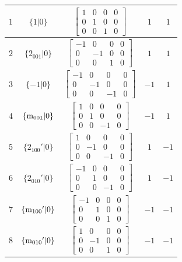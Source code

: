 \documentclass[fleqn,8pt]{jsarticle}
\begin{document}
\begin{longtable}{ccccc}
$ 1 $ & $ \{1|0\} $ & $ \begin{bmatrix} 1 & 0 & 0 & 0 \\ 0 & 1 & 0 & 0 \\ 0 & 0 & 1 & 0 \end{bmatrix} $ & $ 1 $ & $ 1 $ \\ \hline
$ 2 $ & $ \{2{}_{001}|0\} $ & $ \begin{bmatrix} -1 & 0 & 0 & 0 \\ 0 & -1 & 0 & 0 \\ 0 & 0 & 1 & 0 \end{bmatrix} $ & $ 1 $ & $ 1 $ \\ \hline
$ 3 $ & $ \{-1|0\} $ & $ \begin{bmatrix} -1 & 0 & 0 & 0 \\ 0 & -1 & 0 & 0 \\ 0 & 0 & -1 & 0 \end{bmatrix} $ & $ -1 $ & $ 1 $ \\ \hline
$ 4 $ & $ \{{\rm m}_{001}|0\} $ & $ \begin{bmatrix} 1 & 0 & 0 & 0 \\ 0 & 1 & 0 & 0 \\ 0 & 0 & -1 & 0 \end{bmatrix} $ & $ -1 $ & $ 1 $ \\ \hline
$ 5 $ & $ \{2{}_{100}{}'|0\} $ & $ \begin{bmatrix} 1 & 0 & 0 & 0 \\ 0 & -1 & 0 & 0 \\ 0 & 0 & -1 & 0 \end{bmatrix} $ & $ 1 $ & $ -1 $ \\ \hline
$ 6 $ & $ \{2{}_{010}{}'|0\} $ & $ \begin{bmatrix} -1 & 0 & 0 & 0 \\ 0 & 1 & 0 & 0 \\ 0 & 0 & -1 & 0 \end{bmatrix} $ & $ 1 $ & $ -1 $ \\ \hline
$ 7 $ & $ \{{\rm m}_{100}{}'|0\} $ & $ \begin{bmatrix} -1 & 0 & 0 & 0 \\ 0 & 1 & 0 & 0 \\ 0 & 0 & 1 & 0 \end{bmatrix} $ & $ -1 $ & $ -1 $ \\ \hline
$ 8 $ & $ \{{\rm m}_{010}{}'|0\} $ & $ \begin{bmatrix} 1 & 0 & 0 & 0 \\ 0 & -1 & 0 & 0 \\ 0 & 0 & 1 & 0 \end{bmatrix} $ & $ -1 $ & $ -1 $ \\ \hline

\end{longtable}
\end{document}
